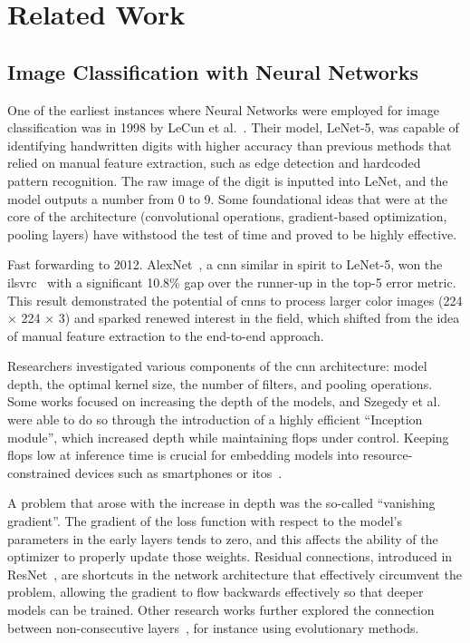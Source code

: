 \chapter{Related Work}
\label{ch:related-work}

\section{Image Classification with Neural Networks}
\label{sec:image-classification-with-neural-networks}

One of the earliest instances where Neural Networks were employed for image classification was in 1998 by LeCun et al.~\cite{GradientBasedLecun1998}. Their model, LeNet-5, was capable of identifying handwritten digits with higher accuracy than previous methods that relied on manual feature extraction, such as edge detection and hardcoded pattern recognition. The raw image of the digit is inputted into LeNet, and the model outputs a number from 0 to 9.
Some foundational ideas that were at the core of the architecture (convolutional operations, gradient-based optimization, pooling layers) have withstood the test of time and proved to be highly effective.

Fast forwarding to 2012. AlexNet~\cite{ImagenetClassiKrizhe2017}, a \acrfull{cnn} similar in spirit to LeNet-5, won the \acrfull{ilsvrc}~\cite{ImagenetLargeRussak2014} with a significant 10.8\% gap over the runner-up in the top-5 error metric. This result demonstrated the potential of \acrshort{cnn}s to process larger color images (224 × 224 × 3) and sparked renewed interest in the field, which shifted from the idea of manual feature extraction to the end-to-end approach.

Researchers investigated various components of the \acrshort{cnn} architecture: model depth, the optimal kernel size, the number of filters, and pooling operations. Some works \cite{VeryDeepConvoSimony2014, GoingDeeperWiSzeged2014} focused on increasing the depth of the models, and Szegedy et al.~\cite{GoingDeeperWiSzeged2014} were able to do so through the introduction of a highly efficient ``Inception module'', which increased depth while maintaining \acrfull{flops} under control. Keeping \acrshort{flops} low at inference time is crucial for embedding models into resource-constrained devices such as smartphones or \acrfull{itos}~\cite{SqueezenetAleIandol2016, MnasnetPlatfoTanM2018, MobilenetsEffHoward2017}.

A problem that arose with the increase in depth was the so-called ``vanishing gradient''. The gradient of the loss function with respect to the model's parameters in the early layers tends to zero, and this affects the ability of the optimizer to properly update those weights.
Residual connections, introduced in ResNet~\cite{DeepResidualLHeKa2015, IdentityMappinHeKa2016}, are shortcuts in the network architecture that effectively circumvent the problem, allowing the gradient to flow backwards effectively so that deeper models can be trained.
Other research works further explored the connection between non-consecutive layers~\cite{DualPathNetwoChen2017, DenselyConnectHuang2016}, for instance using evolutionary methods\cite{DesigningNeuraMiller1989, EvolvingNeuralStanle2002}.

